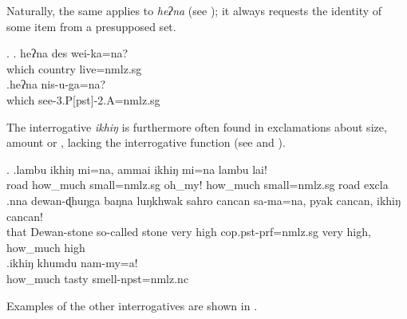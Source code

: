 Naturally, the same applies to \emph{heʔna}  (see \Next); it always requests the identity of some item from a presupposed set.

\ex. \ag. heʔna des     wei-ka=na?\\
which country live{=nmlz.sg}\\
 
\bg.heʔna  nis-u-ga=na?\\
which see{\sc -3.P[pst]-2.A=nmlz.sg}\\

The interrogative \emph{ikhiŋ} is furthermore often found in exclamations about size, amount or , lacking the interrogative function (see \Next and \LLast[b]).

\ex. \ag.lambu ikhiŋ   mi=na, ammai  ikhiŋ   mi=na  lambu lai!\\
road how\_much small{\sc =nmlz.sg} oh\_my! how\_much small{\sc =nmlz.sg} road {\sc excla}\\
 
\bg.nna  dewan-ɖhuŋga baŋna    luŋkhwak sahro cancan sa-ma=na,                pyak cancan, ikhiŋ   cancan!\\
that Dewan-stone so-called stone very high {\sc cop.pst-prf=nmlz.sg} very high, how\_much high\\
\bg.ikhiŋ khumdu nam-my=a!\\
how\_much  tasty smell{\sc [3sg]-npst=nmlz.nc}\\

 Examples of the other interrogatives are shown in \Next.

